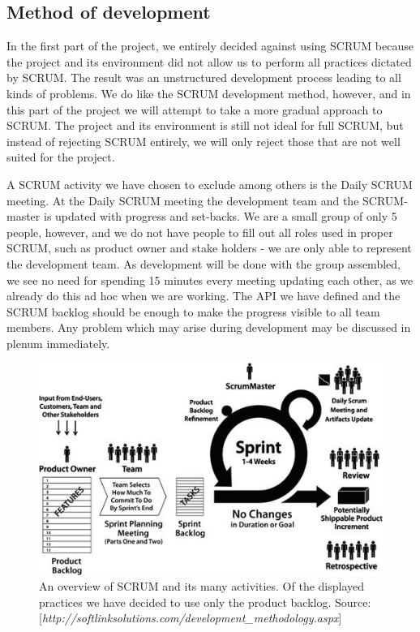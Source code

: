 \subsection{Method of development}
In the first part of the project, we entirely decided against using SCRUM because the project and its environment did not allow us to perform all practices dictated by SCRUM. The result was an unstructured development process leading to all kinds of problems.
We do like the SCRUM development method, however, and in this part of the project we will attempt to take a more gradual approach to SCRUM. The project and its environment is still not ideal for full SCRUM, but instead of rejecting SCRUM entirely, we will only reject those that are not well suited for the project.

A SCRUM activity we have chosen to exclude among others is the Daily SCRUM meeting.
At the Daily SCRUM meeting the development team and the SCRUM-master is updated with progress and set-backs.
We are a small group of only 5 people, however, and we do not have people to fill out all roles used in proper SCRUM, such as product owner and stake holders - we are only able to represent the development team.
As development will be done with the group assembled, we see no need for spending 15 minutes every meeting updating each other, as we already do this ad hoc when we are working.
The API we have defined and the SCRUM backlog should be enough to make the progress visible to all team members. Any problem which may arise during development may be discussed in plenum immediately.

\begin{figure}[t]
  \includegraphics[width=\textwidth]{illustrations/scrum.jpg}
  \caption{An overview of SCRUM and its many activities. Of the displayed practices we have decided to use only the product backlog. Source: [\textit{http://softlinksolutions.com/development\_methodology.aspx}]}
  \label{scrum_picture}
\end{figure}

